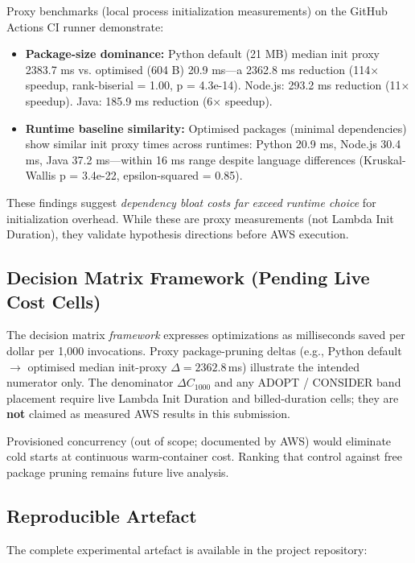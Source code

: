 Proxy benchmarks (local process initialization measurements) on the GitHub Actions CI runner demonstrate:

\begin{itemize}
    \item \textbf{Package-size dominance:} Python default (21 MB) median init proxy 2383.7 ms vs. optimised (604 B) 20.9 ms—a 2362.8 ms reduction (114× speedup, rank-biserial = 1.00, p = 4.3e-14). Node.js: 293.2 ms reduction (11× speedup). Java: 185.9 ms reduction (6× speedup).
    
    \item \textbf{Runtime baseline similarity:} Optimised packages (minimal dependencies) show similar init proxy times across runtimes: Python 20.9 ms, Node.js 30.4 ms, Java 37.2 ms—within 16 ms range despite language differences (Kruskal-Wallis p = 3.4e-22, epsilon-squared = 0.85).
\end{itemize}

These findings suggest \textit{dependency bloat costs far exceed runtime choice} for initialization overhead. While these are proxy measurements (not Lambda Init Duration), they validate hypothesis directions before AWS execution.

\subsection{Decision Matrix Framework (Pending Live Cost Cells)}

The decision matrix \textit{framework} expresses optimizations as milliseconds saved per dollar per 1{,}000 invocations. Proxy package-pruning deltas (e.g., Python default $\rightarrow$ optimised median init-proxy $\Delta = 2362.8$\,ms) illustrate the intended numerator only. The denominator $\Delta C_{1000}$ and any ADOPT / CONSIDER band placement require live Lambda Init Duration and billed-duration cells; they are \textbf{not} claimed as measured AWS results in this submission.

Provisioned concurrency (out of scope; documented by AWS) would eliminate cold starts at continuous warm-container cost. Ranking that control against free package pruning remains future live analysis.

\subsection{Reproducible Artefact}

The complete experimental artefact is available in the project repository:

